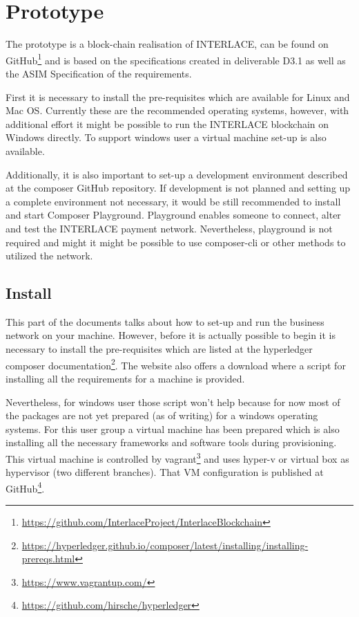 \section{Prototype}
\label{sec:prototype}

The prototype is a block-chain realisation of INTERLACE, can be found on GitHub\footnote{\url{https://github.com/InterlaceProject/InterlaceBlockchain}} and is based on the specifications created in deliverable D3.1\cite{INTERLACE_D31} as well as the ASIM Specification of the requirements.

First it is necessary to install the pre-requisites which are available for Linux and Mac OS. Currently these are the recommended operating systems, however, with additional effort it might be possible to run the INTERLACE blockchain on Windows directly. To support windows user a virtual machine set-up is also available.

Additionally, it is also important to set-up a development environment described at the composer GitHub repository. If development is not planned and setting up a complete environment not necessary, it would be still recommended to install and start Composer Playground. Playground enables someone to connect, alter and test the INTERLACE payment network. Nevertheless, playground is not required and might it might be possible to use composer-cli or other methods to utilized the network.

\subsection{Install}

This part of the documents talks about how to set-up and run the business network on your machine. However, before it is actually possible to begin it is necessary to install the pre-requisites which are listed at the hyperledger composer documentation\footnote{\url{https://hyperledger.github.io/composer/latest/installing/installing-prereqs.html}}. The website also offers a download where a script for installing all the requirements for a machine is provided.

Nevertheless, for windows user those script won't help because for now most of the packages are not yet prepared (as of writing) for a windows operating systems. For this user group a virtual machine has been prepared which is also installing all the necessary frameworks and software tools during provisioning. This virtual machine is controlled by vagrant\footnote{\url{https://www.vagrantup.com/}} and uses hyper-v or virtual box as hypervisor (two different branches). That VM configuration is published at GitHub\footnote{\url{https://github.com/hirsche/hyperledger}}.

